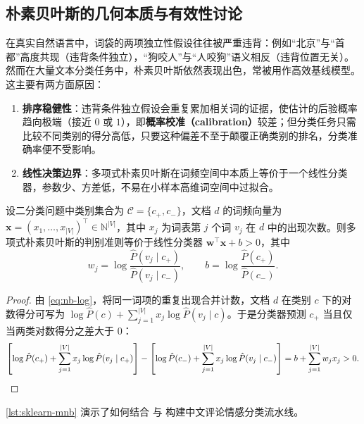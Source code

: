 \subsection{朴素贝叶斯的几何本质与有效性讨论}

在真实自然语言中，词袋的两项独立性假设往往被严重违背：例如“北京”与“首都”高度共现（违背条件独立），“狗咬人”与“人咬狗”语义相反（违背位置无关）。然而在大量文本分类任务中，朴素贝叶斯依然表现出色，常被用作高效基线模型。这主要有两方面原因：
\begin{enumerate}
  \item \textbf{排序稳健性}：违背条件独立假设会重复累加相关词的证据，使估计的后验概率趋向极端（接近 $0$ 或 $1$），即\textbf{概率校准（calibration）}较差；但分类任务只需比较不同类别的得分高低，只要这种偏差不至于颠覆正确类别的排名，分类准确率便不受影响。
  \item \textbf{线性决策边界}：多项式朴素贝叶斯在词频空间中本质上等价于一个线性分类器，参数少、方差低，不易在小样本高维词空间中过拟合。
\end{enumerate}

\begin{proposition}[多项式朴素贝叶斯的线性判别形式]\label{prop:mnb-linear}
设二分类问题中类别集合为 $\mathcal{C}=\{c_+, c_-\}$，文档 $d$ 的词频向量为 $\mathbf{x}=(x_1,\dots,x_{|V|})^\top\in\mathbb{N}^{|V|}$，其中 $x_j$ 为词表第 $j$ 个词 $v_j$ 在 $d$ 中的出现次数。则多项式朴素贝叶斯的判别准则等价于线性分类器 $\mathbf{w}^\top\mathbf{x} + b > 0$，其中
\[
w_j = \log\frac{\hat{P}(v_j\mid c_+)}{\hat{P}(v_j\mid c_-)}, \qquad
b = \log\frac{\hat{P}(c_+)}{\hat{P}(c_-)}.
\]
\end{proposition}
\begin{proof}
由 \cref{eq:nb-log}，将同一词项的重复出现合并计数，文档 $d$ 在类别 $c$ 下的对数得分可写为 $\log\hat{P}(c) + \sum_{j=1}^{|V|} x_j \log\hat{P}(v_j\mid c)$。于是分类器预测 $c_+$ 当且仅当两类对数得分之差大于 $0$：
\[
\left[\log\hat{P}(c_+) + \sum_{j=1}^{|V|} x_j \log\hat{P}(v_j\mid c_+)\right]
- \left[\log\hat{P}(c_-) + \sum_{j=1}^{|V|} x_j \log\hat{P}(v_j\mid c_-)\right]
= b + \sum_{j=1}^{|V|} w_j x_j > 0. \qedhere
\]
\end{proof}

\cref{lst:sklearn-mnb} 演示了如何结合  与  构建中文评论情感分类流水线。

